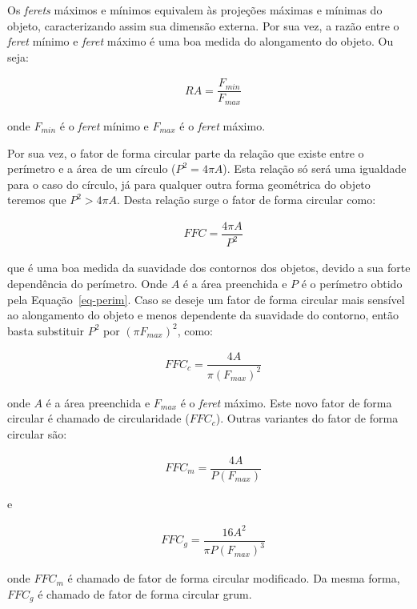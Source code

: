 Os \textit{ferets} máximos e mínimos equivalem às projeções máximas e
mínimas do objeto, caracterizando assim sua dimensão externa. Por sua
vez, a razão entre o \textit{feret} mínimo e \textit{feret} máximo é
uma boa medida do alongamento do objeto. Ou seja:

\begin{align} 
 &RA=\dfrac{F_{min}}{F_{max}}\label{eq-ra}
\end{align}

onde $F_{min}$ é o \textit{feret} mínimo e $F_{max}$ é o
\textit{feret} máximo.

Por sua vez, o fator de forma circular parte da relação que existe
entre o perímetro e a área de um círculo ($P^2 = 4 \pi A$). Esta
relação só será uma igualdade para o caso do círculo, já para qualquer
outra forma geométrica do objeto teremos que $P^2 > 4 \pi A$. Desta
relação surge o fator de forma circular como:

\begin{align}
 &FFC=\dfrac{4\pi A}{P^{2}}\label{eq-ffc}
\end{align} 

que é uma boa medida da suavidade dos contornos dos objetos, devido a
sua forte dependência do perímetro. Onde $A$ é a área preenchida e $P$
é o perímetro obtido pela Equação~\eqref{eq-perim}. Caso se deseje um
fator de forma circular mais sensível ao alongamento do objeto e menos
dependente da suavidade do contorno, então basta substituir $P^2$ por
$(\pi F_{max})^2$, como:

\begin{align}
 &FFC_c=\dfrac{4 A}{\pi (F_{max})^{2}}\label{eq-ffcc}
\end{align}

onde $A$ é a área preenchida e $F_{max}$ é o \textit{feret}
máximo. Este novo fator de forma circular é chamado de circularidade
($FFC_c$). Outras variantes do fator de forma circular são:

\begin{align}
 &FFC_m=\dfrac{4 A}{P (F_{max})}\label{eq-ffcm}
\end{align}

e

\begin{align}
 &FFC_g=\dfrac{16 A^{2}}{\pi P(F_{max})^{3}}\label{eq-ffcg}
\end{align}

onde $FFC_m$ é chamado de fator de forma circular
modificado.\cite{121} Da mesma forma, $FFC_g$ é chamado de fator de
forma circular grum.\cite{502}

